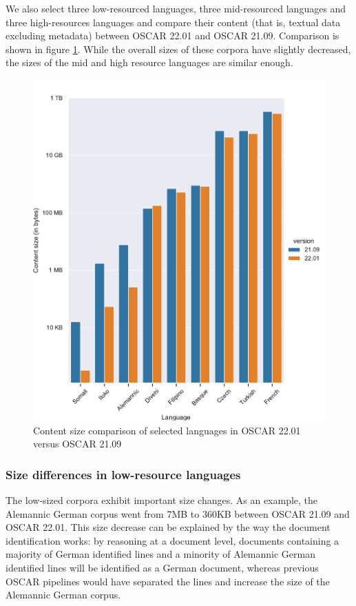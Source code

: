 We also select three low-resourced languages, three mid-resourced languages and three high-resources languages and compare their content (that is, textual data excluding metadata) between OSCAR 22.01 and OSCAR 21.09. Comparison is shown in figure \ref{fig.2}. While the overall sizes of these corpora  have slightly decreased, the sizes of the mid and high resource languages are similar enough.

\begin{figure}[!ht]
    \begin{center}
        \includegraphics[scale=0.50]{static/media/oscar/towards/size_comp_content}
        \caption{Content size comparison of selected languages in OSCAR 22.01 versus OSCAR 21.09}
        \label{fig.2}
    \end{center}
\end{figure}

\subsubsection{Size differences in low-resource languages}

The low-sized corpora exhibit important size changes. As an example, the Alemannic German corpus went from 7MB to 360KB between OSCAR 21.09 and OSCAR 22.01. This size decrease can be explained by the way the document identification works: by reasoning at a document level, documents containing a majority of German identified lines and a minority of Alemannic German identified lines will be identified as a German document, whereas previous OSCAR pipelines would have separated the lines and increase the size of the Alemannic German corpus.

